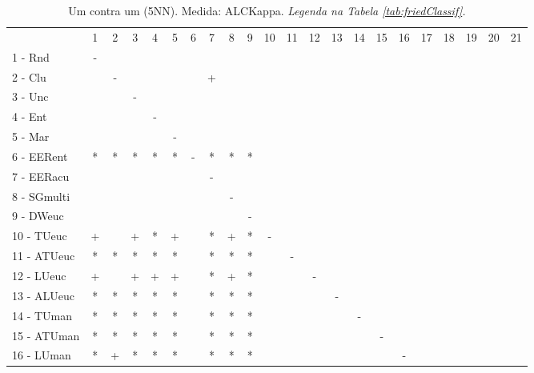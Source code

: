 \begin{table}[h]
\caption{Um contra um (5NN). Medida: ALCKappa. \textit{Legenda na Tabela \ref{tab:friedClassif}.}}
\begin{center}\begin{tabular}{lcc|cc|cc|cc|cc|cc|cc|cc|cc|cc|c}
 			& 1 & 2 & 3 & 4 & 5 & 6 & 7 & 8 & 9 & 10 & 11 & 12 & 13 & 14 & 15 & 16 & 17 & 18 & 19 & 20 & 21\\
1 - Rnd  	& - &   &   &   &   &   &   &   &   &   &   &   &   &   &   &   &   &   &   &   &   \\
2 - Clu  	&   & - &   &   &   &   & + &   &   &   &   &   &   &   &   &   &   &   &   &   &   \\ \hline
3 - Unc  	&   &   & - &   &   &   &   &   &   &   &   &   &   &   &   &   &   &   &   &   &   \\
4 - Ent  	&   &   &   & - &   &   &   &   &   &   &   &   &   &   &   &   &   &   &   &   &   \\ \hline
5 - Mar  	&   &   &   &   & - &   &   &   &   &   &   &   &   &   &   &   &   &   &   &   &   \\
6 - EERent	& * & * & * & * & * & - & * & * & * &   &   &   &   &   &   &   &   &   &   &   &   \\ \hline
7 - EERacu	&   &   &   &   &   &   & - &   &   &   &   &   &   &   &   &   &   &   &   &   &   \\
8 - SGmulti	&   &   &   &   &   &   &   & - &   &   &   &   &   &   &   &   &   &   &   &   &   \\ \hline
9 - DWeuc	&   &   &   &   &   &   &   &   & - &   &   &   &   &   &   &   &   &   &   &   &   \\
10 - TUeuc	& + &   & + & * & + &   & * & + & * & - &   &   &   &   &   &   &   &   &   &   &   \\ \hline
11 - ATUeuc	& * & * & * & * & * &   & * & * & * &   & - &   &   &   &   &   &   &   &   &   &   \\
12 - LUeuc	& + &   & + & + & + &   & * & + & * &   &   & - &   &   &   &   &   &   &   &   &   \\ \hline
13 - ALUeuc	& * & * & * & * & * &   & * & * & * &   &   &   & - &   &   &   &   &   &   &   &   \\
14 - TUman	& * & * & * & * & * &   & * & * & * &   &   &   &   & - &   &   &   &   &   &   &   \\ \hline
15 - ATUman	& * & * & * & * & * &   & * & * & * &   &   &   &   &   & - &   &   &   &   &   &   \\
16 - LUman	& * & + & * & * & * &   & * & * & * &   &   &   &   &   &   & - &   &   &   &   &   \\ \hline

\end{tabular}
\end{center}
\end{table}
